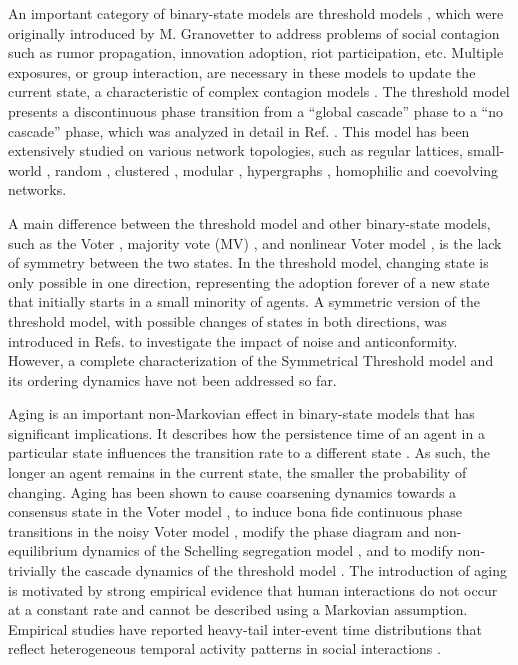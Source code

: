 An important category of binary-state models are threshold models \cite{watts-2002}, which were originally introduced by M. Granovetter \cite{granovetter-1978} to address problems of social contagion such as rumor propagation, innovation adoption, riot participation, etc. Multiple exposures, or group interaction, are necessary in these models to update the current state, a characteristic of complex contagion models \cite{centola-2007,unknown-author-2018}. The threshold model presents a discontinuous phase transition from a ``global cascade'' phase to a ``no cascade'' phase, which was analyzed in detail in Ref. \cite{watts-2002}. This model has been extensively studied on various network topologies, such as regular lattices, small-world \cite{centola-2007}, random \cite{gleeson-2007}, clustered \cite{hackett-2011,hackett-2013}, modular \cite{gleeson-2008}, hypergraphs \cite{de-arruda-2020}, homophilic \cite{diaz-diaz-2022} and coevolving \cite{min2023threshold} networks. 
	
	A main difference between the threshold model and other binary-state models, such as the Voter \cite{Voter-original}, majority vote (MV) \cite{de1992isotropic,pereira2005majority,campos2003small}, and nonlinear Voter model \cite{castellano-2009,mobilia2015nonlinear,mellor2016characterization,Min-2017,jewski-2017,peralta-2018}, is the lack of symmetry between the two states. In the threshold model, changing state is only possible in one direction, representing the adoption forever of a new state that initially starts in a small minority of agents. A symmetric version of the threshold model, with possible changes of states in both directions, was introduced in Refs. \cite{nowak2019homogeneous,nowak2020symmetrical} to investigate the impact of noise and anticonformity. However, a complete characterization of the Symmetrical Threshold model and its ordering dynamics have not been addressed so far.
	
Aging is an important non-Markovian effect in binary-state models that has significant implications. It describes how the persistence time of an agent in a particular state influences the transition rate to a different state \cite{stark-2008, fernandez-gracia-2011, perez-2016, boguna-2014, chen-2020}. As such, the longer an agent remains in the current state, the smaller the probability of changing. Aging has been shown to cause coarsening dynamics towards a consensus state in the Voter model \cite{fernandez-gracia-2011,peralta-2020C}, to induce bona fide continuous phase transitions in the noisy Voter model \cite{artime-2018,peralta-2020A}, modify the phase diagram and non-equilibrium dynamics of the Schelling segregation model \cite{Abella-2022}, and to modify non-trivially the cascade dynamics of the threshold model \cite{Abella-2022-AME}. The introduction of aging is motivated by strong empirical evidence that human interactions do not occur at a constant rate and cannot be described using a Markovian assumption. Empirical studies have reported heavy-tail inter-event time distributions that reflect heterogeneous temporal activity patterns in social interactions \cite{karsai-2011, rybski-2009, zignani-2016, artime-2017, kumar-2020}.
	
